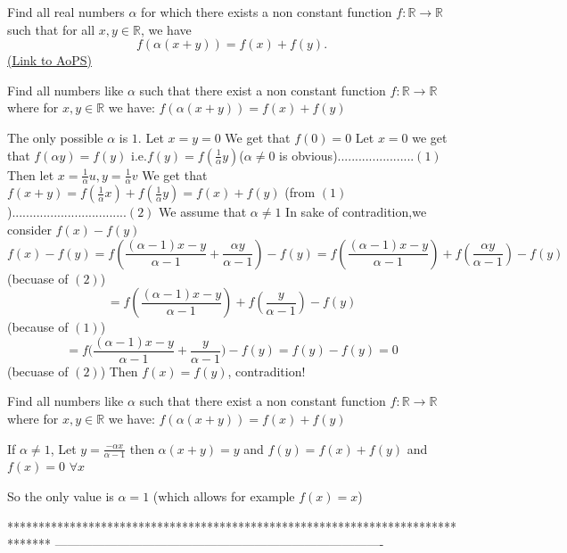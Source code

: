 \begin{problem}
	Find all real numbers $\alpha$ for which there exists a non constant function $f: \mathbb{R}\rightarrow\mathbb{R}$ such that for all $x,y\in\mathbb{R}$, we have
\[f(\alpha(x+y))=f(x)+f(y).\]
	\flushright \href{https://artofproblemsolving.com/community/c6h152295}{(Link to AoPS)}
\end{problem}



\begin{mysolution}
	\begin{tcolorbox}Find all numbers like $\alpha$ such that there exist a non constant function $f: \mathbb{R}\rightarrow\mathbb{R}$ where for $x,y\in\mathbb{R}$ we have:
$f(\alpha(x+y))=f(x)+f(y)$\end{tcolorbox}
The only possible $\alpha$ is $1$.
Let $x=y=0$ We get that $f(0)=0$
Let $x=0$ we get that $f(\alpha y)=f(y)$ i.e.$f(y)=f(\frac{1}{\alpha}y)$($\alpha\not=0$ is obvious)......................$(1)$
Then let $x=\frac{1}{\alpha}u,y=\frac{1}{\alpha}v$
We get that $f(x+y)=f(\frac{1}{\alpha}x)+f(\frac{1}{\alpha}y)=f(x)+f(y)$ (from $(1)$).................................$(2)$
We assume that $\alpha\not=1$
In sake of contradition,we consider $f(x)-f(y)$
\[f(x)-f(y)=f(\frac{(\alpha-1)x-y}{\alpha-1}+\frac{\alpha y}{\alpha-1})-f(y) =f(\frac{(\alpha-1)x-y}{\alpha-1})+f(\frac{\alpha y}{\alpha-1})-f(y) \]
(becuase of $(2)$)
\[=f(\frac{(\alpha-1)x-y}{\alpha-1})+f(\frac{y}{\alpha-1})-f(y) \]
(because of $(1)$)
\[{=f(\frac{(\alpha-1)x-y}{\alpha-1}+\frac{y}{\alpha-1}})-f(y)=f(y)-f(y)=0 \]
(becuase of $(2)$)
Then $f(x)=f(y)$, contradition!
\end{mysolution}



\begin{mysolution}
	\begin{tcolorbox}Find all numbers like $\alpha$ such that there exist a non constant function $f: \mathbb{R}\rightarrow\mathbb{R}$ where for $x,y\in\mathbb{R}$ we have:
$f(\alpha(x+y))=f(x)+f(y)$\end{tcolorbox}

If $\alpha\neq 1$, Let $y=\frac{-\alpha x}{\alpha-1}$ then $\alpha(x+y)=y$ and $f(y)=f(x)+f(y)$ and $f(x)=0$ $\forall x$

So the only value is $\alpha=1$ (which allows for example $f(x)=x$)
\end{mysolution}
*******************************************************************************
-------------------------------------------------------------------------------


